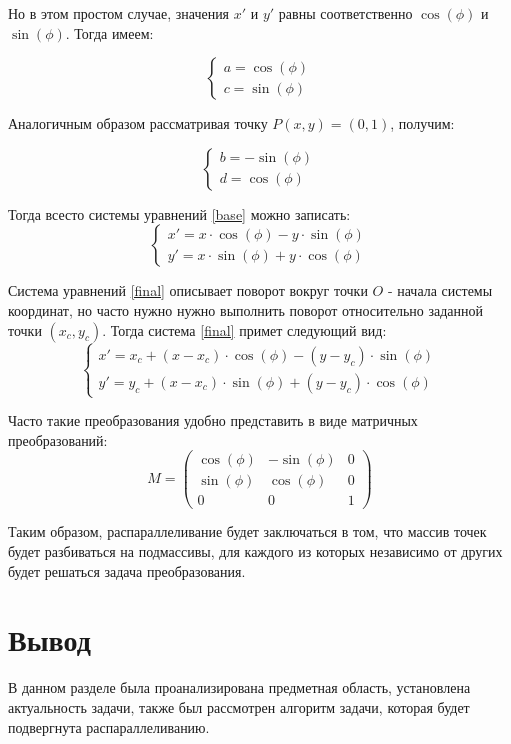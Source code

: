 Но в этом простом случае, значения $x'$ и $y'$ равны соответственно $\cos(\phi)$ и $\sin(\phi)$. Тогда имеем:

\begin{equation}
	\label{a_c}
	\begin{cases}
		a = \cos(\phi)
		\\
		c = \sin(\phi)
	\end{cases}
\end{equation}

Аналогичным образом рассматривая точку $P(x, y) = (0, 1)$, получим:

\begin{equation}
	\label{b_d}
	\begin{cases}
		b = -\sin(\phi) 
		\\
		d = \cos(\phi)
	\end{cases}
\end{equation}

Тогда всесто системы уравнений \ref{base} можно записать:
\begin{equation}
	\label{final}
	\begin{cases}
		x' = x\cdot\cos(\phi) - y\cdot\sin(\phi) 
		\\
		y' = x\cdot\sin(\phi) + y\cdot\cos(\phi) 
	\end{cases}
\end{equation}

Система уравнений \ref{final} описывает поворот вокруг точки $O$ - начала системы координат, но часто нужно нужно выполнить поворот относительно заданной точки $(x_c, y_c)$. Тогда система \ref{final} примет следующий вид:
\begin{equation}
	\label{final}
	\begin{cases}
		x' = x_c + (x-x_c)\cdot\cos(\phi) - (y-y_c)\cdot\sin(\phi) 
		\\
		y' = y_c + (x-x_c)\cdot\sin(\phi) + (y-y_c)\cdot\cos(\phi) 
	\end{cases}
\end{equation}

Часто такие преобразования удобно представить в виде матричных преобразований:
\begin{equation}
	\label{mtr}
	M = \begin{pmatrix}
		\cos(\phi) & -\sin(\phi)& 0 \\
		\sin(\phi) & \cos(\phi) & 0 \\
		0 & 0 & 1
	\end{pmatrix}
\end{equation}

Таким образом, распараллеливание будет заключаться в том, что
массив точек будет разбиваться на подмассивы, для каждого из которых независимо от других будет решаться задача преобразования.



\section{Вывод}

В данном разделе была проанализирована предметная область,
установлена актуальность задачи, также был рассмотрен алгоритм задачи, которая будет подвергнута распараллеливанию.


